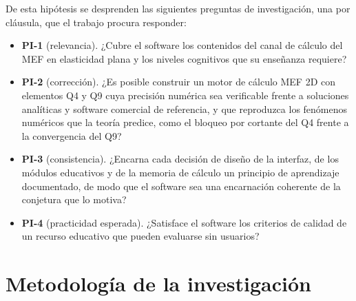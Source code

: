 De esta hipótesis se desprenden las siguientes preguntas de investigación, una por cláusula, que el trabajo procura responder:

\begin{itemize}
    \item \textbf{PI-1} (relevancia). ¿Cubre el software los contenidos del canal de cálculo del MEF en elasticidad plana y los niveles cognitivos que su enseñanza requiere?
    \item \textbf{PI-2} (corrección). ¿Es posible construir un motor de cálculo MEF 2D con elementos Q4 y Q9 cuya precisión numérica sea verificable frente a soluciones analíticas y software comercial de referencia, y que reproduzca los fenómenos numéricos que la teoría predice, como el bloqueo por cortante del Q4 frente a la convergencia del Q9?
    \item \textbf{PI-3} (consistencia). ¿Encarna cada decisión de diseño de la interfaz, de los módulos educativos y de la memoria de cálculo un principio de aprendizaje documentado, de modo que el software sea una encarnación coherente de la conjetura que lo motiva?
    \item \textbf{PI-4} (practicidad esperada). ¿Satisface el software los criterios de calidad de un recurso educativo que pueden evaluarse sin usuarios?
\end{itemize}

\section*{Metodología de la investigación}


